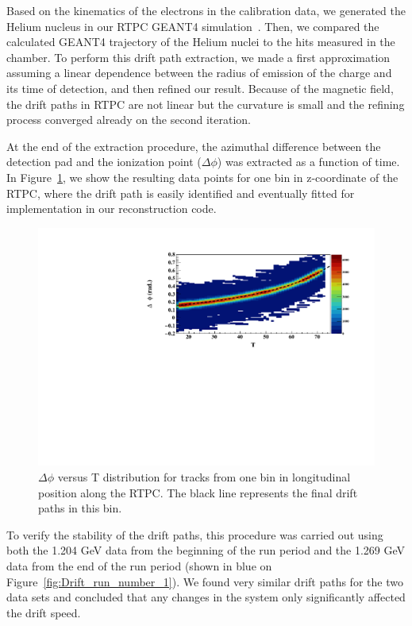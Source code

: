 \documentclass[preprint,5p]{elsarticle}
\begin{document}
Based on the kinematics of the electrons in the calibration data, we generated 
the Helium nucleus in our RTPC GEANT4 simulation~\cite{GEANT4}. Then,
we compared the calculated GEANT4 trajectory of the Helium nuclei to 
the hits measured in the chamber. To perform this drift path extraction, 
we made a first approximation assuming a linear dependence between the radius 
of emission of the charge and its time of detection, and then refined our 
result. Because of the magnetic field, the drift paths in RTPC are not linear 
but the curvature is small and the refining  process converged already on the 
second iteration.

At the end of the extraction procedure, the azimuthal difference between the 
detection pad and the ionization point ($\Delta\phi$) was extracted as a 
function of time. In Figure~\ref{fig:DELTA_PHI_TDC}, we show the resulting data 
points for one bin in z-coordinate of the RTPC, where the drift path is easily 
identified and eventually fitted for implementation in our reconstruction code.

\begin{figure}[tb]
\centering
\includegraphics[scale=0.46]{FitResult_p2_11.pdf}
\caption{$\Delta \phi$ versus T distribution for tracks
from one bin in longitudinal position along the RTPC. The black line represents 
the final drift paths in this bin.}
\label{fig:DELTA_PHI_TDC}
\end{figure}

To verify the stability of the drift paths, this procedure was carried out 
using both the 1.204 GeV data from the beginning of the run period and the 
1.269 GeV data from the end of the run period (shown in blue on 
Figure~\ref{fig:Drift_run_number_1}). We found very similar drift paths for the 
two data sets and concluded that any changes in the system only significantly 
affected the drift speed.
\end{document}
